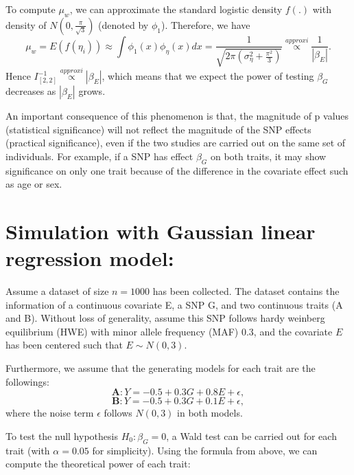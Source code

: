 \documentclass[
]{article}
\begin{document}
To compute \(\mu_w\), we can approximate the standard logistic density
\(f(.)\) with density of \(N(0,\frac{\pi}{\sqrt{3}})\) (denoted by
\(\phi_1\)). Therefore, we have
\[\mu_w = E(f(\eta_i)) \approx \int\phi_1(x)\phi_{\eta}(x)dx = \frac{1}{\sqrt{2\pi(\sigma_\eta^2+\frac{\pi^2}{3})}} \overset{approxi}{\propto} \frac{1}{|\beta_E|}.\]
Hence \(I^{-1}_{[2,2]} \overset{approxi}{\propto} |\beta_E|\), which
means that we expect the power of testing \(\beta_G\) decreases as
\(|\beta_E|\) grows.

An important consequence of this phenomenon is that, the magnitude of p
values (statistical significance) will not reflect the magnitude of the
SNP effects (practical significance), even if the two studies are
carried out on the same set of individuals. For example, if a SNP has
effect \(\beta_G\) on both traits, it may show significance on only one
trait because of the difference in the covariate effect such as age or
sex.

\hypertarget{simulation-with-gaussian-linear-regression-model}{%
\section{Simulation with Gaussian linear regression
model:}\label{simulation-with-gaussian-linear-regression-model}}

Assume a dataset of size \(n=1000\) has been collected. The dataset
contains the information of a continuous covariate E, a SNP G, and two
continuous traits (A and B). Without loss of generality, assume this SNP
follows hardy weinberg equilibrium (HWE) with minor allele frequency
(MAF) \(0.3\), and the covariate \(E\) has been centered such that
\(E\sim N(0,3)\).

Furthermore, we assume that the generating models for each trait are the
followings: \[\textbf{A}:Y = -0.5 + 0.3G + 0.8E + \epsilon,\]
\[\textbf{B}: Y = -0.5 + 0.3G + 0.1E + \epsilon,\] where the noise term
\(\epsilon\) follows \(N(0,3)\) in both models.

To test the null hypothesis \(H_0: \beta_G = 0\), a Wald test can be
carried out for each trait (with \(\alpha=0.05\) for simplicity). Using
the formula from above, we can compute the theoretical power of each
trait:
\end{document}
